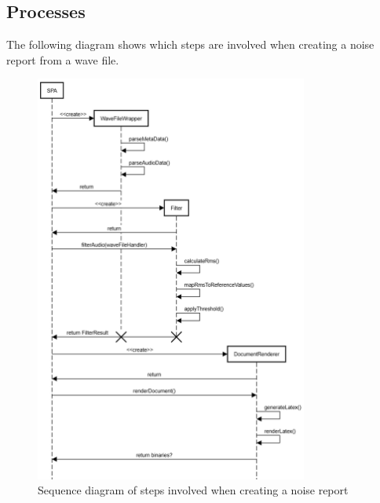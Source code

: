 \subsection{Processes}
The following diagram shows which steps are involved when creating a noise report from a wave file.

\begin{figure}[H]
    \centering
    \includegraphics[width=0.8\textwidth]{../assets/sequence_diagram_from_wave_file_to_pdf.png}
    \caption{Sequence diagram of steps involved when creating a noise report}
\end{figure}

